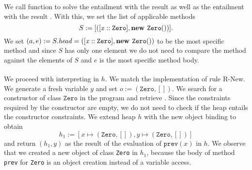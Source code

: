 \begin{example}
We call function  to solve the entailment
with the result 
as well as the entailment
with the result .
With this, we set the list of applicable methods
\[ S := [([\mathit{x} :: \mathit{\texttt{Zero}}], \textbf{new } \mathit{\texttt{Zero}}())]. \]
We set $(a, e) := S.\mathit{head} = ([\mathit{x} :: \mathit{\texttt{Zero}}], \textbf{new } \mathit{\texttt{Zero}}())$
to be the most specific method
and since $S$ has only one element we do not need to compare
the method against the elements of $S$
and $e$ is the most specific method body.\\
\\
We proceed with interpreting  in $h$.
We match the implementation of rule R-New.
We generate a fresh variable $y$
and set $o := (\texttt{Zero}, [])$.
We search for a constructor of class $\texttt{Zero}$ in the program
and retrieve .
Since the constraints required by the constructor are empty,
we do not need to check if the heap entails the constructor constraints.
We extend heap $h$ with the new object binding to obtain
\[ h_1 := [x \mapsto (\texttt{Zero}, []), y \mapsto (\texttt{Zero}, [])] \]
and return $(h_1, y)$ as the result of the evaluation of $\texttt{prev}(x)$ in $h$.
We observe that we created a new object of class \texttt{Zero} in $h_1$,
because the body of method \texttt{prev} for \texttt{Zero}
is an object creation instead of a variable access.


\end{example}


